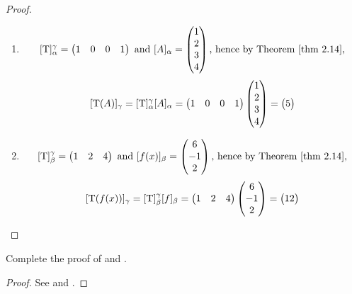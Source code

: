 \begin{proof}
\begin{enumerate}
\item
\[
    [\T]_{\alpha}^{\gamma} = \begin{pmatrix} 1 & 0 & 0 & 1 \end{pmatrix}
    \text{ and  }
    [A]_{\alpha} = \begin{pmatrix} 1 \\ 2 \\ 3 \\ 4 \end{pmatrix}
    \text{, hence by \THM{2.14},}
\]
\[
    [\mathrm{T}(A)]_{\gamma} = [\mathrm{T}]_{\alpha}^{\gamma} [A]_{\alpha}
    = \begin{pmatrix} 1 & 0 & 0 & 1 \end{pmatrix}
    \begin{pmatrix} 1 \\ 2 \\ 3 \\ 4 \end{pmatrix}
    = \begin{pmatrix} 5 \end{pmatrix}
\]

\item
\[
    [\T]_{\beta}^{\gamma} = \begin{pmatrix} 1 & 2 & 4 \end{pmatrix}
    \text{ and  }
    [f(x)]_{\beta} = \begin{pmatrix} 6 \\ -1 \\ 2 \end{pmatrix}
    \text{, hence by \THM{2.14},}
\]
\[
    [\mathrm{T}(f(x))]_{\gamma} = [\mathrm{T}]_{\beta}^{\gamma} [f]_{\beta}
    = \begin{pmatrix} 1 & 2 & 4 \end{pmatrix}
    \begin{pmatrix} 6 \\ -1 \\ 2 \end{pmatrix}
    = \begin{pmatrix} 12 \end{pmatrix}
\]
\end{enumerate}
\end{proof}

\begin{exercise} \label{exercise 2.3.5}
Complete the proof of  and .
\end{exercise}

\begin{proof}
See  and .
\end{proof}

